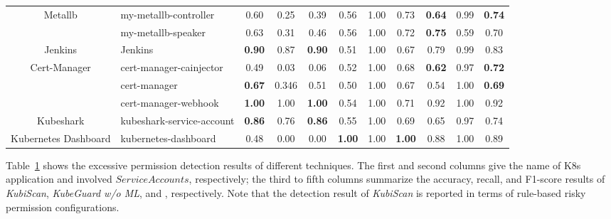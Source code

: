 \documentclass[conference]{IEEEtran}
\theoremstyle{definition}
\begin{document}
\begin{table}[!htb]
{\begin{tabular}{clccc|ccc|ccc}
        \multirow{2}{*}{Metallb}  
        & my-metallb-controller & 0.60 & 0.25 & 0.39 & 0.56 & 1.00 & 0.73 & \cellcolor{gray!14}\textbf{0.64} & 0.99 & \cellcolor{gray!24}\textbf{0.74} \\ 
        & my-metallb-speaker & 0.63 & 0.31 & 0.46 & 0.56 & 1.00 & 0.72 & \cellcolor{gray!25}\textbf{0.75} & 0.59 & 0.70 \\ \hline

        \multirow{1}{*}{Jenkins} 
        & Jenkins &\cellcolor{gray!40}\textbf{0.90} & 0.87 & \cellcolor{gray!40}\textbf{0.90} & 0.51 & 1.00 & 0.67 & 0.79 & 0.99 & 0.83 \\ \hline

        \multirow{3}{*}{Cert-Manager} 
        & cert-manager-cainjector & 0.49 & 0.03 & 0.06 & 0.52 & 1.00 & 0.68 & \cellcolor{gray!12}\textbf{0.62} & 0.97 & \cellcolor{gray!22}\textbf{0.72} \\ 
        & cert-manager & \cellcolor{gray!17}\textbf{0.67} & 0.346 & 0.51 & 0.50 & 1.00 & 0.67 & 0.54 & 1.00 & \cellcolor{gray!19}\textbf{0.69} \\ 
        & cert-manager-webhook & \cellcolor{gray!50}\textbf{1.00} & 1.00 & \cellcolor{gray!50}\textbf{1.00} & 0.54 & 1.00 & 0.71 & 0.92 & 1.00 & 0.92 \\ \hline

        \multirow{1}{*}{Kubeshark} 
        & kubeshark-service-account & \cellcolor{gray!36}\textbf{0.86} & 0.76 & \cellcolor{gray!36}\textbf{0.86} & 0.55 & 1.00 & 0.69 & 0.65 & 0.97 & 0.74 \\ \hline
        
        \multirow{1}{*}{Kubernetes Dashboard} 
        & kubernetes-dashboard & 0.48 & 0.00 & 0.00 & \cellcolor{gray!50}\textbf{1.00} & 1.00 & \cellcolor{gray!50}\textbf{1.00} & 0.88 & 1.00 & 0.89 \\ 
        \bottomrule
    \end{tabular}}
    \label{tab:RPP_performance}
\end{table}

Table~\ref{tab:RPP_performance} shows the excessive permission detection results of different techniques. The first and second columns give the name of K8s application and involved $ServiceAccounts$, respectively; the third to fifth columns summarize the accuracy, recall, and F1-score results of \textit{KubiScan}, \textit{KubeGuard w/o ML}, and \kg, respectively. Note that the detection result of \textit{KubiScan} is reported in terms of rule-based risky permission configurations. 
\end{document}
